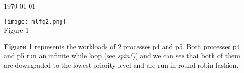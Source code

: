\documentclass[8pt]{article}
\begin{document}
\hfill \small{\today} \\
\begin{center}{\bf
{}
}\end{center}
\begin{center}{\texttt{[image: mlfq2.png]}} \\
{Figure 1} \\
\end{center}

\textbf{Figure 1} represents the workloads of 2 processes p4 and p5.
Both processes p4 and p5 run an infinite while loop (see \textit{spin()}) and we can see that both of them are downgraded to the lowest priority level and are run in round-robin fashion.



\end{document}
